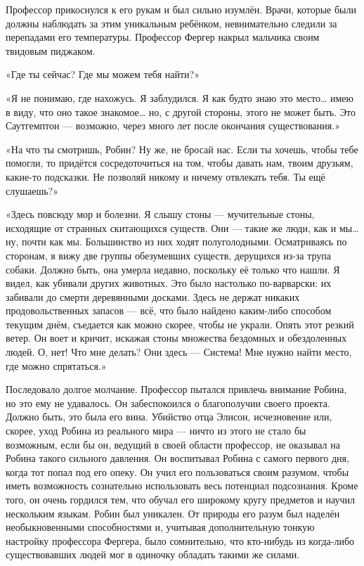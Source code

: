 \documentclass[a4paper,12pt]{book}
\begin{document}
\par
Профессор прикоснулся к его рукам и был сильно изумлён. Врачи, которые были должны наблюдать за этим уникальным ребёнком, невнимательно следили за перепадами его температуры. Профессор Фергер накрыл мальчика своим твидовым пиджаком.
\par
«Где ты сейчас? Где мы можем тебя найти?»
\par
«Я не понимаю, где нахожусь. Я заблудился. Я как будто знаю это место… имею в виду, что оно такое знакомое… но, с другой стороны, этого не может быть. Это Саутгемптон — возможно, через много лет после окончания существования.»\\
\par
«На что ты смотришь, Робин? Ну же, не бросай нас. Если ты хочешь, чтобы тебе помогли, то придётся сосредоточиться на том, чтобы давать нам, твоим друзьям, какие-то подсказки. Не позволяй никому и ничему отвлекать тебя. Ты ещё слушаешь?»
\par
«Здесь повсюду мор и болезни. Я слышу стоны — мучительные стоны, исходящие от странных скитающихся существ. Они — такие же люди, как и мы… ну, почти как мы. Большинство из них ходят полуголодными. Осматриваясь по сторонам, я вижу две группы обезумевших существ, дерущихся из-за трупа собаки. Должно быть, она умерла недавно, поскольку её только что нашли. Я видел, как убивали других животных. Это было настолько по-варварски: их забивали до смерти деревянными досками. Здесь не держат никаких продовольственных запасов — всё, что было найдено каким-либо способом текущим днём, съедается как можно скорее, чтобы не украли. Опять этот резкий ветер. Он воет и кричит, искажая стоны множества бездомных и обездоленных людей. О, нет! Что мне делать? Они здесь — Система! Мне нужно найти место, где можно спрятаться.»\\
\par
Последовало долгое молчание. Профессор пытался привлечь внимание Робина, но это ему не удавалось. Он забеспокоился о благополучии своего проекта. Должно быть, это была его вина. Убийство отца Элисон, исчезновение или, скорее, уход Робина из реального мира — ничто из этого не стало бы возможным, если бы он, ведущий в своей области профессор, не оказывал на Робина такого сильного давления. Он воспитывал Робина с самого первого дня, когда тот попал под его опеку. Он учил его пользоваться своим разумом, чтобы иметь возможность сознательно использовать весь потенциал подсознания. Кроме того, он очень гордился тем, что обучал его широкому кругу предметов и научил нескольким языкам. Робин был уникален. От природы его разум был наделён необыкновенными способностями и, учитывая дополнительную тонкую настройку профессора Фергера, было сомнительно, что кто-нибудь из когда-либо существовавших людей мог в одиночку обладать такими же силами.\\
\end{document}
